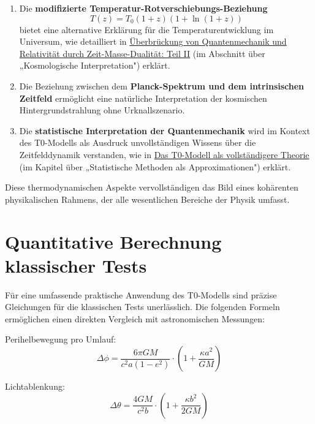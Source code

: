 \documentclass[12pt,a4paper]{article}
\begin{document}
	\begin{enumerate}
		\item Die \textbf{modifizierte Temperatur-Rotverschiebungs-Beziehung}
		\begin{equation}
			T(z) = T_0 (1+z)(1+\ln(1+z))
		\end{equation}
		bietet eine alternative Erklärung für die Temperaturentwicklung im Universum, wie detailliert in \href{https://github.com/jpascher/T0-Time-Mass-Duality/tree/main/2/pdf/English/QMRelTimeMassPart2En.pdf}{Überbrückung von Quantenmechanik und Relativität durch Zeit-Masse-Dualität: Teil II} (im Abschnitt über „Kosmologische Interpretation") erklärt.
		
		\item Die Beziehung zwischen dem \textbf{Planck-Spektrum und dem intrinsischen Zeitfeld} ermöglicht eine natürliche Interpretation der kosmischen Hintergrundstrahlung ohne Urknallszenario.
		
		\item Die \textbf{statistische Interpretation der Quantenmechanik} wird im Kontext des T0-Modells als Ausdruck unvollständigen Wissens über die Zeitfelddynamik verstanden, wie in \href{https://github.com/jpascher/T0-Time-Mass-Duality/tree/main/2/pdf/English/T0-ModelAsCompleteTheory_En.pdf}{Das T0-Modell als vollständigere Theorie} (im Kapitel über „Statistische Methoden als Approximationen") erklärt.
	\end{enumerate}
	
	Diese thermodynamischen Aspekte vervollständigen das Bild eines kohärenten physikalischen Rahmens, der alle wesentlichen Bereiche der Physik umfasst.
	
	\section{Quantitative Berechnung klassischer Tests}
	\label{subsec:classical_tests}
	
	Für eine umfassende praktische Anwendung des T0-Modells sind präzise Gleichungen für die klassischen Tests unerlässlich. Die folgenden Formeln ermöglichen einen direkten Vergleich mit astronomischen Messungen:
	
	Perihelbewegung pro Umlauf:
	\begin{equation}
		\Delta\phi = \frac{6\pi GM}{c^2a(1-e^2)} \cdot \left(1 + \frac{\kappa a^2}{GM}\right)
	\end{equation}
	
	Lichtablenkung:
	\begin{equation}
		\Delta\theta = \frac{4GM}{c^2b} \cdot \left(1 + \frac{\kappa b^2}{2GM}\right)
	\end{equation}
	
\end{document}
